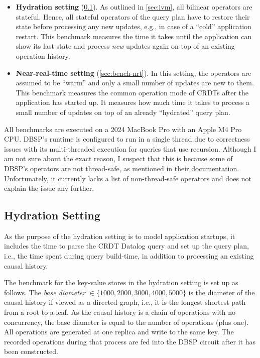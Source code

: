 \begin{itemize}
    \item \textbf{Hydration setting} (\ref{sec:bench-hydration}).
          As outlined in \ref{sec:ivm}, all bilinear operators are stateful.
          Hence, all stateful operators of the query plan have to restore
          their state before processing any new updates, e.g., in case of a
          ``cold'' application restart. This benchmark measures the time it takes
          until the application can show its last state and process \emph{new}
          updates again on top of an existing operation history.
    \item \textbf{Near-real-time setting} (\ref{sec:bench-nrt}).
          In this setting, the operators are assumed to be ``warm'' and only
          a small number of updates are new to them.
          This benchmark measures the common operation mode of \acp{CRDT} after
          the application has started up. It measures how much time it takes
          to process a small number of updates on top of an already ``hydrated''
          query plan.
\end{itemize}

All benchmarks are executed on a 2024 MacBook Pro with an Apple M4 Pro CPU.
DBSP's runtime is configured to run in a single thread due to correctness
issues with its multi-threaded execution for queries that use recursion.
Although I am not sure about the exact reason,
I suspect that this is because some of DBSP's operators are not thread-safe,
as mentioned in their
\href{https://docs.rs/dbsp/0.64.0/dbsp/circuit/struct.Runtime.html\#method.init_circuit}{documentation}.
Unfortunately, it currently lacks a list of non-thread-safe operators
and does not explain the issue any further\footnotemark{}.


\subsection{Hydration Setting}\label{sec:bench-hydration}

As the purpose of the hydration setting is to model application startups,
it includes the time to parse the \ac{CRDT} Datalog query and set up the
query plan, i.e., the time spent during query build-time,
in addition to processing an existing causal history.

The benchmark for the key-value stores in the hydration setting is set up as follows.
The \emph{base diameter} \(\in \{1000, 2000, 3000, 4000, 5000\}\) is the diameter
of the causal history if viewed as a directed graph,
i.e., it is the longest shortest path from a root to a leaf.
As the causal history is a chain of operations with no concurrency,
the base diameter is equal to the number of operations (plus one).
All operations are generated at one replica and write to the same key.
The recorded operations during that process are fed into the DBSP circuit
after it has been constructed.

